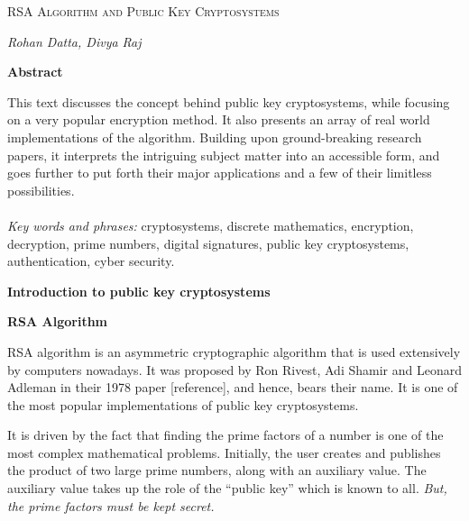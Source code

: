 \documentclass[12 pt]{article}
\begin{document}
\begin{titlepage}
\begin{Huge}
\begin{center}
\textsc{ RSA Algorithm \linebreak
and \linebreak
Public Key Cryptosystems}
\end{center}
\end{Huge}
\begin{center}
\begin{large}
\textsl{ Rohan Datta, Divya Raj}
\end{large}
\end{center}

\bigskip 
\begin{center}
\textbf{Abstract}
\end{center}
This text discusses the concept behind public key cryptosystems, while focusing on a very popular encryption method. It also presents an array of real world implementations of the algorithm.
Building upon ground-breaking research papers, it interprets the intriguing subject matter into an accessible form, and goes further to put forth their major applications and a few of their limitless possibilities.
\\
\\
\textit{Key words and phrases:} cryptosystems, discrete mathematics, encryption, decryption, prime numbers, digital signatures, public key cryptosystems, authentication, cyber security.
\end{titlepage}
\pagebreak
\begin{LARGE}	
\noindent \textbf{{Introduction to public key cryptosystems}}
\end{LARGE}

\noindent 

\pagebreak
\begin{LARGE}
\noindent \textbf{{RSA Algorithm}}
\end{LARGE}\bigskip

\noindent RSA algorithm is an asymmetric cryptographic algorithm that is used extensively by computers nowadays. It was proposed by Ron Rivest, Adi Shamir and Leonard Adleman in their 1978 paper [reference], and hence, bears their name. It is one of the most popular implementations of public key cryptosystems.\bigskip

\noindent It is driven by the fact that finding the prime factors of a number is one of the most complex mathematical problems. Initially, the user creates and publishes the product of two large prime numbers, along with an auxiliary value. The auxiliary value takes up the role of the ``public key'' which is known to all. \emph{But, the prime factors must be kept secret.}\bigskip
\end{document}
